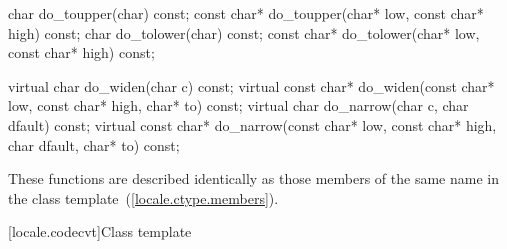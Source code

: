 %
%
%
%
%
%
%
%
\begin{codeblock}
char        do_toupper(char) const;
const char* do_toupper(char* low, const char* high) const;
char        do_tolower(char) const;
const char* do_tolower(char* low, const char* high) const;

virtual char        do_widen(char c) const;
virtual const char* do_widen(const char* low,
                             const char* high,
                             char* to) const;
virtual char        do_narrow(char c, char dfault) const;
virtual const char* do_narrow(const char* low,
                              const char* high,
                              char dfault, char* to) const;
\end{codeblock}

These functions are described identically as those members of the
same name in the
class template~(\ref{locale.ctype.members}).

[locale.codecvt]{Class template }

